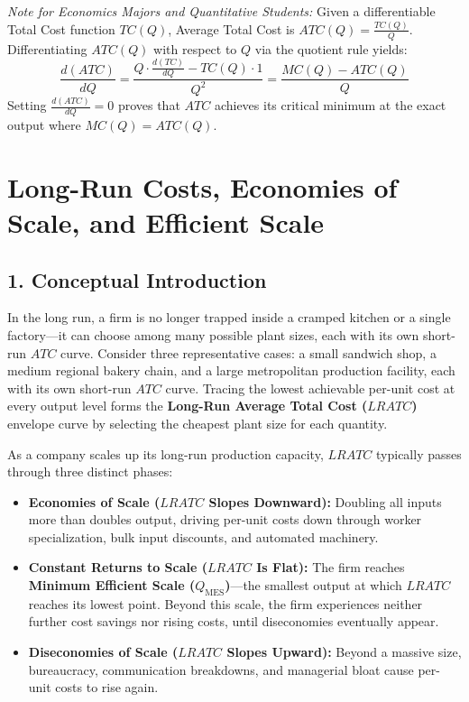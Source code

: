 \documentclass[11pt,letterpaper]{article}
\begin{document}
\begin{tcolorbox}[colback=red!5!white,colframe=red!75!black,title=\textbf{Optional Advanced Section: Calculus Proof of Minimum Cost Crossings}]
\small
\emph{Note for Economics Majors and Quantitative Students:}
Given a differentiable Total Cost function $TC(Q)$, Average Total Cost is $ATC(Q) = \frac{TC(Q)}{Q}$. Differentiating $ATC(Q)$ with respect to $Q$ via the quotient rule yields:
\[
\frac{d(ATC)}{dQ} = \frac{Q \cdot \frac{d(TC)}{dQ} - TC(Q) \cdot 1}{Q^2} = \frac{MC(Q) - ATC(Q)}{Q}
\]
Setting $\frac{d(ATC)}{dQ} = 0$ proves that $ATC$ achieves its critical minimum at the exact output where $MC(Q) = ATC(Q)$.
\end{tcolorbox}

\section{Long-Run Costs, Economies of Scale, and Efficient Scale}

\subsection*{1. Conceptual Introduction}
In the long run, a firm is no longer trapped inside a cramped kitchen or a single factory—it can choose among many possible plant sizes, each with its own short-run $ATC$ curve. Consider three representative cases: a small sandwich shop, a medium regional bakery chain, and a large metropolitan production facility, each with its own short-run $ATC$ curve. Tracing the lowest achievable per-unit cost at every output level forms the \textbf{Long-Run Average Total Cost ($LRATC$)} envelope curve by selecting the cheapest plant size for each quantity.

As a company scales up its long-run production capacity, $LRATC$ typically passes through three distinct phases:
\begin{itemize}
    \item \textbf{Economies of Scale ($LRATC$ Slopes Downward):} Doubling all inputs more than doubles output, driving per-unit costs down through worker specialization, bulk input discounts, and automated machinery.
    \item \textbf{Constant Returns to Scale ($LRATC$ Is Flat):} The firm reaches \textbf{Minimum Efficient Scale ($Q_{\text{MES}}$)}—the smallest output at which $LRATC$ reaches its lowest point. Beyond this scale, the firm experiences neither further cost savings nor rising costs, until diseconomies eventually appear.
    \item \textbf{Diseconomies of Scale ($LRATC$ Slopes Upward):} Beyond a massive size, bureaucracy, communication breakdowns, and managerial bloat cause per-unit costs to rise again.
\end{itemize}
\end{document}
